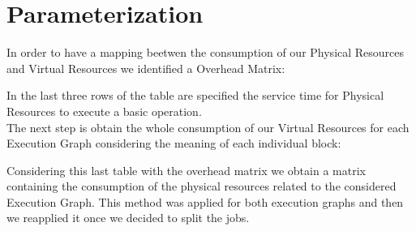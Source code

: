 \chapter{\textbf{Parameterization}}

In order to have a mapping beetwen the consumption of our Physical Resources and Virtual Resources we identified a Overhead Matrix:

\begin{center}
\end{center}
\bigskip

In the last three rows of the table are specified the service time for Physical Resources to execute a basic operation.\\
The next step is obtain the whole consumption of our Virtual Resources for each Execution Graph considering the meaning of each individual block:

\begin{center}
\end{center}


\begin{center}
\end{center}
\bigskip

Considering this last table with the overhead matrix we obtain a matrix containing the consumption of the physical resources related to the considered Execution Graph. This method was applied for both execution graphs and then we reapplied it once we decided to split the jobs.

\begin{center}
\end{center}
